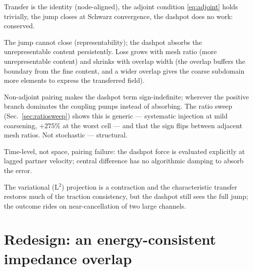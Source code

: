 \documentclass[11pt]{article}
\begin{document}
\begin{description}[style=unboxed,leftmargin=0pt,itemsep=2pt]
  \item[Conforming, implicit.] Transfer is the identity (node-aligned), the
  adjoint condition \eqref{eq:adjoint} holds trivially, the jump closes at
  Schwarz convergence, the dashpot does no work: conserved.
  \item[Nonconforming, dissipative majority.] The jump cannot close
  (representability); the dashpot absorbs the unrepresentable content
  persistently. Loss grows with mesh ratio (more unrepresentable content) and
  shrinks with overlap width (the overlap buffers the boundary from the fine
  content, and a wider overlap gives the coarse subdomain more elements to
  express the transferred field).
  \item[Nonconforming, growth cases.] Non-adjoint pairing makes the
  dashpot term sign-indefinite; wherever the positive branch dominates the
  coupling pumps instead of absorbing. The ratio sweep
  (Sec.~\ref{sec:ratiosweep}) shows this is generic --- systematic injection
  at mild coarsening, $+275\%$ at the worst cell --- and that the sign flips
  between adjacent mesh ratios. Not stochastic --- structural.
  \item[Conforming, explicit free subdomain (IE/EE).] Time-level, not space,
  pairing failure: the dashpot force is evaluated explicitly at lagged partner
  velocity; central difference has no algorithmic damping to absorb the error.
  \item[Variational rescue.] The variational (L$^2$) projection is a contraction and the
  characteristic transfer restores much of the traction consistency, but the
  dashpot still sees the full jump; the outcome rides on near-cancellation of
  two large channels.
\end{description}

\section{Redesign: an energy-consistent impedance overlap}
\label{sec:redesign}
\end{document}
